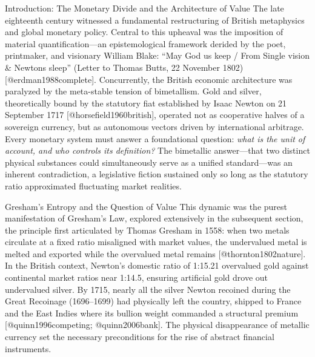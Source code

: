 \documentclass[
  ignorenonframetext,
]{beamer}
\author{\texorpdfstring{}{}}
\date{}
\begin{document}
\begin{frame}{Introduction: The Monetary Divide and the Architecture of
Value}
\protect{}\label{introduction-the-monetary-divide-and-the-architecture-of-value}
The late eighteenth century witnessed a fundamental restructuring of
British metaphysics and global monetary policy. Central to this upheaval
was the imposition of material quantification---an epistemological
framework derided by the poet, printmaker, and visionary William Blake:
``May God us keep / From Single vision \& Newtons sleep'' (Letter to
Thomas Butts, 22 November 1802) {[}@erdman1988complete{]}. Concurrently,
the British economic architecture was paralyzed by the meta-stable
tension of bimetallism. Gold and silver, theoretically bound by the
statutory fiat established by Isaac Newton on 21 September 1717
{[}@horsefield1960british{]}, operated not as cooperative halves of a
sovereign currency, but as autonomous vectors driven by international
arbitrage. Every monetary system must answer a foundational question:
\emph{what is the unit of account, and who controls its definition?} The
bimetallic answer---that two distinct physical substances could
simultaneously serve as a unified standard---was an inherent
contradiction, a legislative fiction sustained only so long as the
statutory ratio approximated fluctuating market realities.

\begin{block}{Gresham's Entropy and the Question of Value}
\protect{}\label{greshams-entropy-and-the-question-of-value}
This dynamic was the purest manifestation of Gresham's Law, explored
extensively in the subsequent section, the principle first articulated
by Thomas Gresham in 1558: when two metals circulate at a fixed ratio
misaligned with market values, the undervalued metal is melted and
exported while the overvalued metal remains {[}@thornton1802nature{]}.
In the British context, Newton's domestic ratio of 1:15.21 overvalued
gold against continental market ratios near 1:14.5, ensuring artificial
gold drove out undervalued silver. By 1715, nearly all the silver Newton
recoined during the Great Recoinage (1696--1699) had physically left the
country, shipped to France and the East Indies where its bullion weight
commanded a structural premium {[}@quinn1996competing;
@quinn2006bank{]}. The physical disappearance of metallic currency set
the necessary preconditions for the rise of abstract financial
instruments.
\end{block}


\end{frame}
\end{document}
